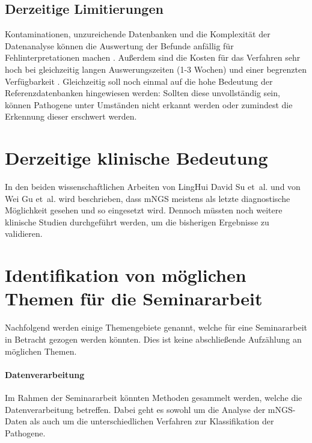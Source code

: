 \documentclass[a4paper, conference]{IEEEtran}
\begin{document}
\subsection{Derzeitige Limitierungen}
Kontaminationen, unzureichende Datenbanken und die Komplexität der Datenanalyse können die Auswertung der Befunde anfällig für Fehlinterpretationen machen \cite{clinicalMetagenomicNextGenerationSequencing} \cite{weiGuSteveMillerCharlesChiuMNGSPathogenDetection}. Außerdem sind die Kosten für das Verfahren sehr hoch \cite{clinicalMetagenomicNextGenerationSequencing} \cite{weiGuSteveMillerCharlesChiuMNGSPathogenDetection} bei gleichzeitig langen Auswerungszeiten (1-3 Wochen) \cite{clinicalMetagenomicNextGenerationSequencing} und einer begrenzten Verfügbarkeit \cite{clinicalMetagenomicNextGenerationSequencing}. Gleichzeitig soll noch einmal auf die hohe Bedeutung der Referenzdatenbanken hingewiesen werden: Sollten diese unvollständig sein, können Pathogene unter Umständen nicht erkannt werden oder zumindest die Erkennung dieser erschwert werden.

\section{Derzeitige klinische Bedeutung}
In den beiden wissenschaftlichen Arbeiten von LingHui David Su et~al. \cite{clinicalMetagenomicNextGenerationSequencing} und von Wei Gu et~al. \cite{weiGuSteveMillerCharlesChiuMNGSPathogenDetection} wird beschrieben, dass mNGS meistens als letzte diagnostische Möglichkeit gesehen und so eingesetzt wird. Dennoch müssten noch weitere klinische Studien durchgeführt werden, um die bisherigen Ergebnisse zu validieren.

\section{Identifikation von möglichen Themen für die Seminararbeit}
Nachfolgend werden einige Themengebiete genannt, welche für eine Seminararbeit in Betracht gezogen werden könnten. Dies ist keine abschließende Aufzählung an möglichen Themen.

\paragraph{Datenverarbeitung}
Im Rahmen der Seminararbeit könnten Methoden gesammelt werden, welche die Datenverarbeitung betreffen. Dabei geht es sowohl um die Analyse der mNGS-Daten als auch um die unterschiedlichen Verfahren zur Klassifikation der Pathogene.
\end{document}
